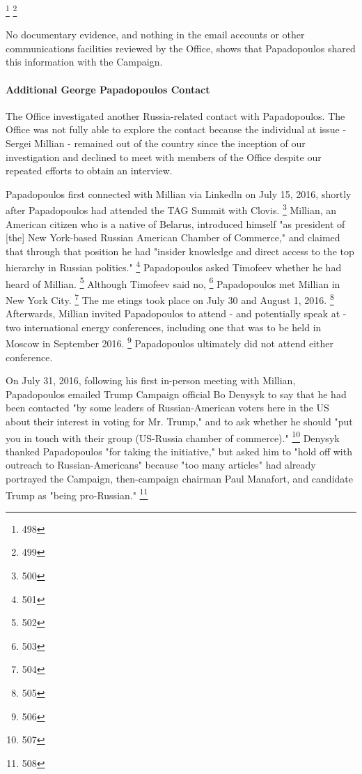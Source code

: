 \footnote{498}
\footnote{499}

No documentary evidence, and nothing in the email accounts or other communications facilities reviewed by the Office, shows that Papadopoulos shared this information with the Campaign.

\paragraph{Additional George Papadopoulos Contact}

The Office investigated another Russia-related contact with Papadopoulos.
The Office was not fully able to explore the contact because the individual at issue - Sergei Millian - remained out of the country since the inception of our investigation and declined to meet with members of the Office despite our repeated efforts to obtain an interview.

Papadopoulos first connected with Millian via Linkedln on July 15, 2016, shortly after Papadopoulos had attended the TAG Summit with Clovis.%
\footnote{500}
Millian, an American citizen who is a native of Belarus, introduced himself "as president of [the] New York-based Russian American Chamber of Commerce," and claimed that through that position he had "insider knowledge and direct access to the top hierarchy in Russian politics."%
\footnote{501}
Papadopoulos asked Timofeev whether he had heard of Millian.%
\footnote{502}
Although Timofeev said no,%
\footnote{503}
Papadopoulos met Millian in New York City.%
\footnote{504}
The me etings took place on July 30 and August 1, 2016.%
\footnote{505}
Afterwards, Millian invited Papadopoulos to attend - and potentially speak at - two international energy conferences, including one that was to be held in Moscow in September 2016.%
\footnote{506}
Papadopoulos ultimately did not attend either conference.

On July 31, 2016, following his first in-person meeting with Millian, Papadopoulos emailed Trump Campaign official Bo Denysyk to say that he had been contacted "by some leaders of Russian-American voters here in the US about their interest in voting for Mr. Trump," and to ask whether he should "put you in touch with their group (US-Russia chamber of commerce)."%
\footnote{507}
Denysyk thanked Papadopoulos "for taking the initiative," but asked him to "hold off with outreach to Russian-Americans" because "too many articles" had already portrayed the Campaign, then-campaign chairman Paul Manafort, and candidate Trump as "being pro-Russian."%
\footnote{508}

